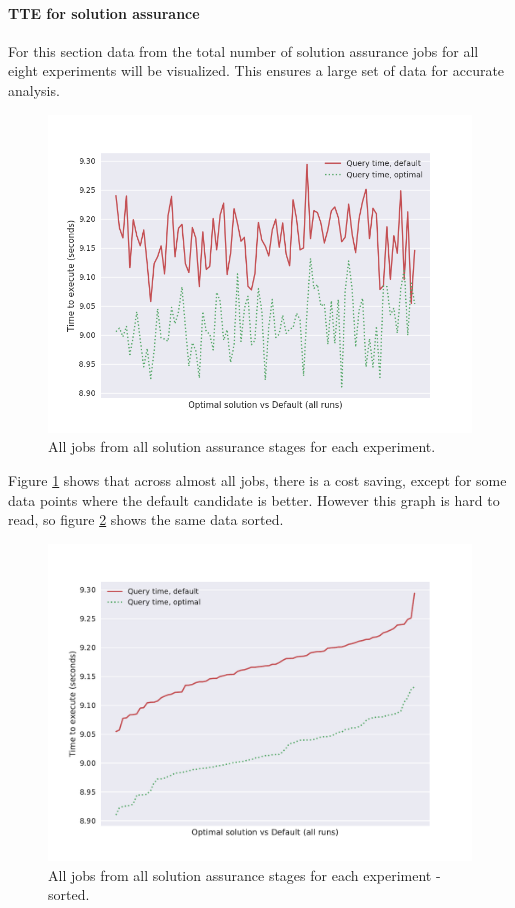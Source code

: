 \documentclass[a4paper,english]{report}
\begin{document}
	\paragraph{TTE for solution assurance} For this section data from the total number of solution assurance jobs for all eight experiments will be visualized. This ensures a large set of data for accurate analysis.
	\begin{figure}[H]
		\centering
		\includegraphics[width=\textwidth]{costsaving}
		\caption{All jobs from all solution assurance stages for each experiment.}
		\label{fig:costsaving}
	\end{figure}
	Figure \ref{fig:costsaving} shows that across almost all jobs, there is a cost saving, except for some data points where the default candidate is better. However this graph is hard to read, so figure \ref{fig:costsaving2} shows the same data sorted.
	\begin{figure}[H]
		\centering
		\includegraphics[width=\textwidth]{costsaving2}
		\caption{All jobs from all solution assurance stages for each experiment - sorted.}
		\label{fig:costsaving2}
	\end{figure}
\end{document}
